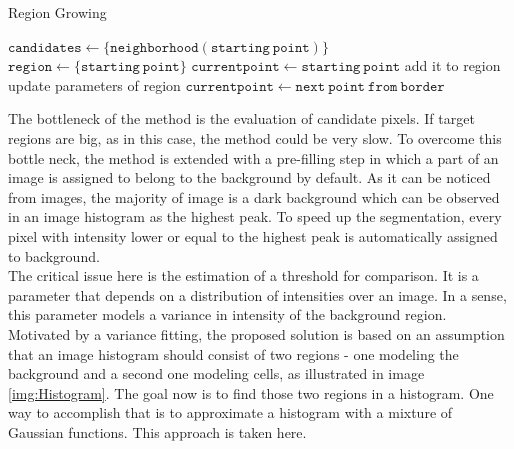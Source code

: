 \begin{algorithm}
\caption{Region Growing }
  \label{alg:RegGrow}
\begin{algorithmic}[1]
 \State $\mathtt{candidates} \gets \{ \mathtt{neighborhood}(\mathtt{starting \ point}) \}$
 \State $\mathtt{region} \gets \{ \mathtt{starting \ point} \}$
 \State $\mathtt{current point} \gets \mathtt{starting \ point}$
 			\State add it to region
 			\State update parameters of region
 		\EndIf 
 	\EndFor
 	\State $\mathtt{current point} \gets \mathtt{next \ point \ from \ border}$
 \EndWhile
 \EndFunction
\end{algorithmic}
\end{algorithm}

The bottleneck of the method is the evaluation of candidate pixels. If target regions are big, as in this case, the method could be very slow. To overcome this bottle neck, the method is extended with a pre-filling step in which a part of an image is assigned to belong to the background by default. As it can be noticed from images, the majority of image is a dark background which can be observed in an image histogram as the highest peak. To speed up the segmentation, every pixel with intensity lower or equal to the highest peak is automatically assigned to background.   \\

The critical issue here is the estimation of a threshold for comparison. It is a parameter that depends on a distribution of intensities over an image. In a sense, this parameter models a variance in intensity of the background region. Motivated by a variance fitting, the proposed solution is based on an assumption that an image histogram should consist of two regions - one modeling the background and a second one modeling cells, as illustrated in image \ref{img:Histogram}. The goal now is to find those two regions in a histogram. One way to accomplish that is to approximate a histogram with a mixture of Gaussian functions. This approach is taken here.  

